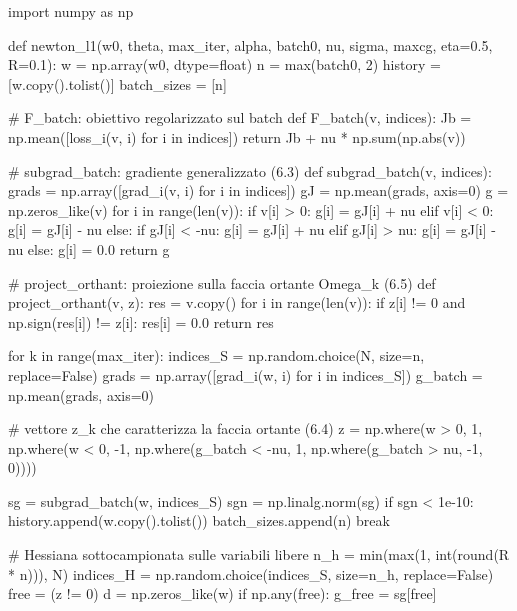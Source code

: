 \documentclass[a4paper,12pt]{article}
\numberwithin{equation}{section}
\numberwithin{figure}{section}
\numberwithin{table}{section}
\begin{document}
\begin{pythoncode}[title= Newton-L1]

import numpy as np

def newton_l1(w0, theta, max_iter, alpha, batch0, nu, sigma, maxcg,
              eta=0.5, R=0.1):
    w = np.array(w0, dtype=float)
    n = max(batch0, 2)
    history     = [w.copy().tolist()]
    batch_sizes = [n]

    # F_batch: obiettivo regolarizzato sul batch
    def F_batch(v, indices):
        Jb = np.mean([loss_i(v, i) for i in indices])
        return Jb + nu * np.sum(np.abs(v))

    # subgrad_batch: gradiente generalizzato (6.3)
    def subgrad_batch(v, indices):
        grads = np.array([grad_i(v, i) for i in indices])
        gJ = np.mean(grads, axis=0)
        g = np.zeros_like(v)
        for i in range(len(v)):
            if v[i] > 0:
                g[i] = gJ[i] + nu
            elif v[i] < 0:
                g[i] = gJ[i] - nu
            else:
                if gJ[i] < -nu:
                    g[i] = gJ[i] + nu
                elif gJ[i] > nu:
                    g[i] = gJ[i] - nu
                else:
                    g[i] = 0.0
        return g

    # project_orthant: proiezione sulla faccia ortante Omega_k (6.5)
    def project_orthant(v, z):
        res = v.copy()
        for i in range(len(v)):
            if z[i] != 0 and np.sign(res[i]) != z[i]:
                res[i] = 0.0
        return res

    for k in range(max_iter):
        indices_S = np.random.choice(N, size=n, replace=False)
        grads = np.array([grad_i(w, i) for i in indices_S])
        g_batch = np.mean(grads, axis=0)

        # vettore z_k che caratterizza la faccia ortante (6.4)
        z = np.where(w > 0, 1,
            np.where(w < 0, -1,
                np.where(g_batch < -nu, 1,
                    np.where(g_batch > nu, -1, 0))))

        sg = subgrad_batch(w, indices_S)
        sgn = np.linalg.norm(sg)
        if sgn < 1e-10:
            history.append(w.copy().tolist())
            batch_sizes.append(n)
            break

        # Hessiana sottocampionata sulle variabili libere
        n_h = min(max(1, int(round(R * n))), N)
        indices_H = np.random.choice(indices_S, size=n_h, replace=False)
        free = (z != 0)
        d = np.zeros_like(w)
        if np.any(free):
            g_free = sg[free]


\end{pythoncode}
\end{document}
